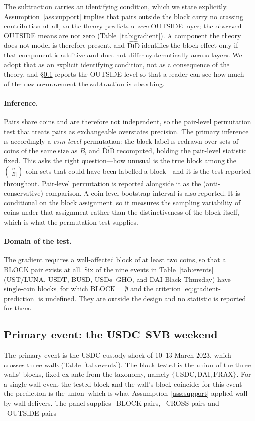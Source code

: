The subtraction carries an identifying condition, which we state explicitly. Assumption~\ref{ass:support} implies that pairs outside the block carry no crossing contribution at all, so the theory predicts a \emph{zero} OUTSIDE layer; the observed OUTSIDE means are not zero (Table~\ref{tab:gradient}). A component the theory does not model is therefore present, and $\widehat{\mathrm{DiD}}$ identifies the block effect only if that component is additive and does not differ systematically across layers. We adopt that as an explicit identifying condition, not as a consequence of the theory, and \S\ref{sec:usdc-svb} reports the OUTSIDE level so that a reader can see how much of the raw co-movement the subtraction is absorbing.

\paragraph{Inference.} Pairs share coins and are therefore not independent, so the pair-level permutation test that treats pairs as exchangeable overstates precision. The primary inference is accordingly a \emph{coin-level} permutation: the block label is redrawn over sets of coins of the same size as $B$, and $\widehat{\mathrm{DiD}}$ recomputed, holding the pair-level statistic fixed. This asks the right question---how unusual is the true block among the $\binom{n}{|B|}$ coin sets that could have been labelled a block---and it is the test reported throughout. Pair-level permutation is reported alongside it as the (anti-conservative) comparison. A coin-level bootstrap interval is also reported. It is conditional on the block assignment, so it measures the sampling variability of coins under that assignment rather than the distinctiveness of the block itself, which is what the permutation test supplies.

\paragraph{Domain of the test.}\label{sec:single} The gradient requires a wall-affected block of at least two coins, so that a BLOCK pair exists at all. Six of the nine events in Table~\ref{tab:events} (UST/LUNA, USDT, BUSD, USDe, GHO, and DAI Black Thursday) have single-coin blocks, for which $\mathrm{BLOCK} = \emptyset$ and the criterion \eqref{eq:gradient-prediction} is undefined. They are outside the design and no statistic is reported for them.

\subsection{Primary event: the USDC--SVB weekend}\label{sec:usdc-svb}
The primary event is the USDC custody shock of 10--13 March 2023, which crosses three walls (Table~\ref{tab:events}). The block tested is the union of the three walls' blocks, fixed ex ante from the taxonomy, namely $\{\text{USDC},\text{DAI},\text{FRAX}\}$. For a single-wall event the tested block and the wall's block coincide; for this event the prediction is the union, which is what Assumption~\ref{ass:support} applied wall by wall delivers. The panel supplies \GUSDCSVBNB\ BLOCK pairs, \GUSDCSVBNC\ CROSS pairs and \GUSDCSVBNO\ OUTSIDE pairs.

